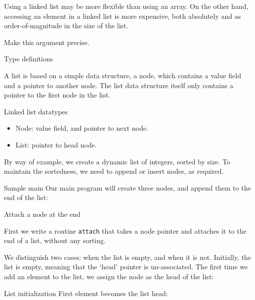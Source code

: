 \begin{exercise}
  Using a linked list may be more flexible than using an array.
  On the other hand, accessing an element in a linked list is
  more expensive, both absolutely and as order-of-magnitude in the size
  of the list.

  Make this argument precise.
\end{exercise}

 {Type definitions}

A list is based on a simple data structure, a node, which contains a
value field and a pointer to another node.
The list data structure itself only contains a pointer to the first node
in the list.

\begin{block}{Linked list datatypes}
  \label{sl:flinktypes}
  \begin{itemize}
  \item Node: value field, and pointer to next node.
  \item List: pointer to head node.
  \end{itemize}
\end{block}

By way of example, we create a dynamic list of integers, sorted by
size.
To maintain the sortedness, we need to append or insert nodes,
as required.

\begin{block}{Sample main}
  \label{sl:flinkmain}
  Our main program will create three nodes,
  and append them to the end of the list:
\end{block}

 {Attach a node at the end}

First we write a routine \lstinline{attach} that takes
a node pointer and attaches it to the end of a list,
without any sorting.


We distinguish two cases: when the list is empty,
and when it is not.
Initially, the list is empty, meaning that the `head' pointer is
un-associated.
The first time we add an element to the list,
we assign the node as the head of the list:
%

\begin{slide}{List initialization}
  \label{sl:flinkinit}
  First element becomes the list head:
\end{slide}

